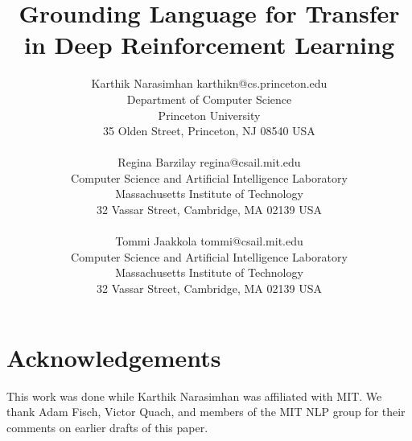 \documentclass[oneside,11pt]{article}
\title{Grounding Language for Transfer in Deep Reinforcement Learning}
\author{\name Karthik Narasimhan \email karthikn@cs.princeton.edu \\
		\addr Department of Computer Science \\
       Princeton University \\
       35 Olden Street, Princeton, NJ 08540 USA \\ \\
       \name Regina Barzilay \email regina@csail.mit.edu \\
       \addr Computer Science and Artificial Intelligence Laboratory \\
       Massachusetts Institute of Technology \\
       32 Vassar Street, Cambridge, MA  02139 USA \\ \\
       \name Tommi Jaakkola \email tommi@csail.mit.edu \\
       \addr Computer Science and Artificial Intelligence Laboratory \\
       Massachusetts Institute of Technology \\
       32 Vassar Street, Cambridge, MA  02139 USA
       }
\date{}
\begin{document}
\maketitle










\section*{Acknowledgements}
This work was done while Karthik Narasimhan was affiliated with MIT. We thank Adam Fisch, Victor Quach, and members of the MIT NLP group for their comments on earlier drafts of this paper.




\end{document}
